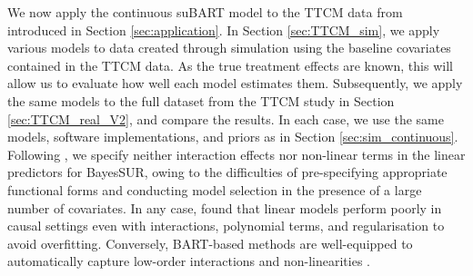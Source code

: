 \documentclass[aoas,preprint]{imsart}
\theoremstyle{plain}
\theoremstyle{definition}
\theoremstyle{remark}
\begin{document}
We now apply the continuous suBART model to the TTCM data from \citet{wiertsema2019cost} introduced in Section \ref{sec:application}. In Section \ref{sec:TTCM_sim}, we apply various models to data created through simulation using the baseline covariates contained in the TTCM data. 
As the true treatment effects are known, this will allow us to evaluate how well each model estimates them. Subsequently, we apply the same models to the full dataset from the TTCM study in Section \ref{sec:TTCM_real_V2}, and compare the results. In each case, we use the same models, software implementations, and priors as in Section \ref{sec:sim_continuous}. Following \citet{wiertsema2019cost}, we specify neither interaction effects nor non-linear terms in the linear predictors for BayesSUR, owing to the difficulties of pre-specifying appropriate functional forms and conducting model selection in the presence of a large number of covariates. In any case, \citet{dorie2019automated} found that linear models perform poorly in causal settings even with interactions, polynomial terms, and regularisation to avoid overfitting. Conversely, BART-based methods are well-equipped to automatically capture low-order interactions and non-linearities \citep{rockova2020semi,rockova2020posterior}.
\end{document}
